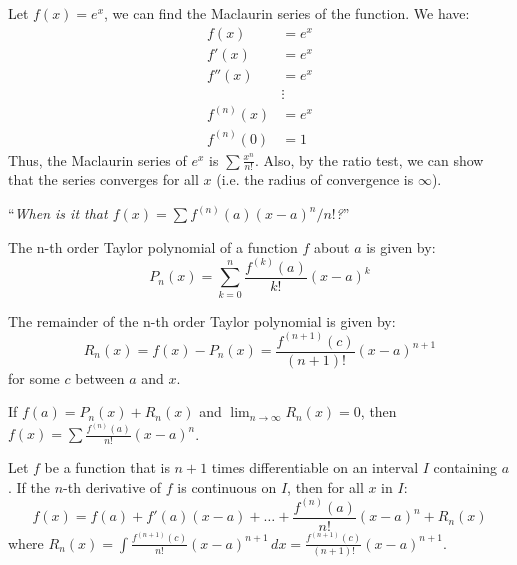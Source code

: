 \documentclass[11pt]{report}
\begin{document}
\begin{example}
    Let $f(x) = e^x$, we can find the Maclaurin series of the function. We have:
    \begin{align*}
        f(x) &= e^x \\
        f'(x) &= e^x \\
        f''(x) &= e^x \\
        &\vdots \\
        f^{(n)}(x) &= e^x \\
        f^{(n)}(0) &= 1
    \end{align*}
    Thus, the Maclaurin series of $e^x$ is $\sum \frac{x^n}{n!}$. Also, by the ratio test, we can show that the series converges for all $x$ (i.e. the radius of convergence is $\infty$).
\end{example}
\begin{center}
    ``\textit{When is it that $f(x) = \sum f^{(n)}(a) (x-a)^n/n!$?}''
\end{center}
\begin{definition}
    The n-th order Taylor polynomial of a function $f$ about $a$ is given by:
    \begin{equation}
        P_n(x) = \sum_{k=0}^{n} \frac{f^{(k)}(a)}{k!} (x-a)^k
    \end{equation}
\end{definition}
\begin{definition}[Remainder]
    The remainder of the n-th order Taylor polynomial is given by:
    \begin{equation}
        R_n(x) = f(x) - P_n(x) = \frac{f^{(n+1)}(c)}{(n+1)!} (x-a)^{n+1}
    \end{equation}
    for some $c$ between $a$ and $x$.
\end{definition}
\begin{theorem}
    If $f(a) = P_n(x) + R_n(x)$ and $\lim_{n \to \infty} R_n(x) = 0$, then $f(x) = \sum \frac{f^{(n)}(a)}{n!} (x-a)^n$.
\end{theorem}
\begin{theorem}
    Let $f$ be a function that is $n+1$ times differentiable on an interval $I$ containing $a$. If the $n$-th derivative of $f$ is continuous on $I$, then for all $x$ in $I$:
    \begin{equation}
        f(x) = f(a) + f'(a)(x-a) + \ldots + \frac{f^{(n)}(a)}{n!} (x-a)^n + R_n(x)
    \end{equation}
    where $R_n(x) = \int \frac{f^{(n+1)}(c)}{n!} (x-a)^{n+1} \, dx = \frac{f^{(n+1)}(c)}{(n+1)!} (x-a)^{n+1}$.
\end{theorem}
\end{document}
